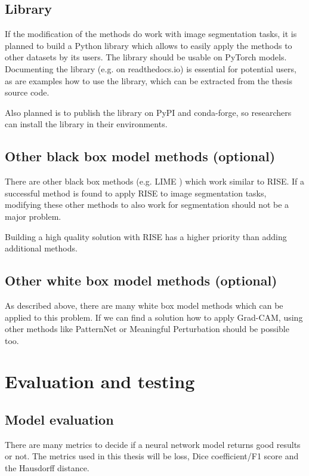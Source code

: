 \subsection{Library}
If the modification of the methods do work with image segmentation tasks, it is planned to build a Python library which allows to easily apply the methods to other datasets by its users. The library should be usable on PyTorch models. Documenting the library (e.g. on readthedocs.io) is essential for potential users, as are examples how to use the library, which can be extracted from the thesis source code.

Also planned is to publish the library on PyPI and conda-forge, so researchers can install the library in their environments.

\subsection{Other black box model methods (optional)}
There are other black box methods (e.g. LIME \cite{ribeiro2016should}) which work similar to RISE. If a successful method is found to apply RISE to image segmentation tasks, modifying these other methods to also work for segmentation should not be a major problem.

Building a high quality solution with RISE has a higher priority than adding additional methods.

\subsection{Other white box model methods (optional)}
As described above, there are many white box model methods which can be applied to this problem. If we can find a solution how to apply Grad-CAM, using other methods like PatternNet \cite{kindermans2017learning} or Meaningful Perturbation \cite{fong2017interpretable} should be possible too.

\section{Evaluation and testing}
\subsection{Model evaluation}
There are many metrics to decide if a neural network model returns good results or not.
The metrics used in this thesis will be loss, Dice coefficient/F1 score and the Hausdorff distance.

